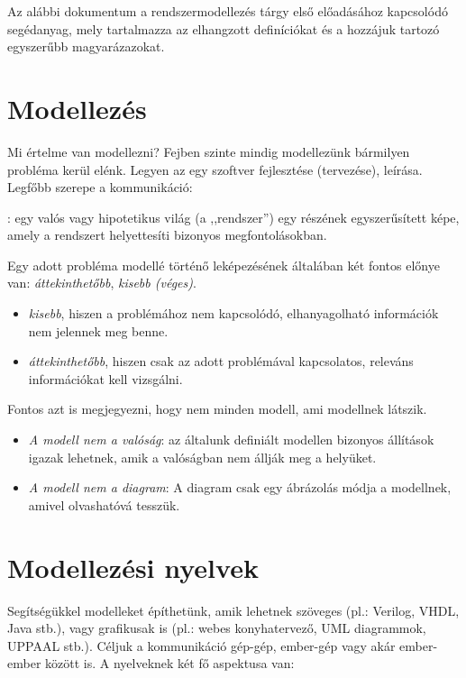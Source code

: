 
Az alábbi dokumentum a rendszermodellezés tárgy első előadásához kapcsolódó segédanyag, mely tartalmazza az elhangzott definíciókat és a hozzájuk tartozó egyszerűbb magyarázazokat.

\section{Modellezés}

Mi értelme van modellezni? Fejben szinte mindig modellezünk bármilyen probléma kerül elénk. Legyen az egy szoftver fejlesztése (tervezése), leírása. Legfőbb szerepe a kommunikáció:

\begin{definicio}
	: egy valós vagy hipotetikus világ (a ,,rendszer'') egy részének egyszerűsített képe, amely a rendszert helyettesíti bizonyos megfontolásokban.
\end{definicio}

Egy adott probléma modellé történő leképezésének általában két fontos előnye van: \emph{áttekinthetőbb}, \emph{kisebb (véges)}.

\begin{itemize}
	\item \emph{kisebb}, hiszen a problémához nem kapcsolódó, elhanyagolható információk nem jelennek meg benne.
	\item \emph{áttekinthetőbb}, hiszen csak az adott problémával kapcsolatos, releváns információkat kell vizsgálni.
\end{itemize}

Fontos azt is megjegyezni, hogy nem minden modell, ami modellnek látszik.

\begin{itemize}
	\item \emph{A modell nem a valóság}: az általunk definiált modellen bizonyos állítások igazak lehetnek, amik a valóságban nem állják meg a helyüket.
	\item \emph{A modell nem a diagram}: A diagram csak egy ábrázolás módja a modellnek, amivel olvashatóvá tesszük. 
\end{itemize}

\section{Modellezési nyelvek}

Segítségükkel modelleket építhetünk, amik lehetnek szöveges (pl.: Verilog, VHDL, Java stb.), vagy grafikusak is (pl.: webes konyhatervező, UML diagrammok, UPPAAL stb.). Céljuk a kommunikáció gép-gép, ember-gép vagy akár ember-ember között is. A nyelveknek két fő aspektusa van:

